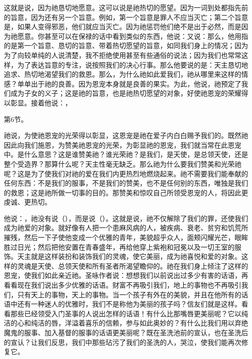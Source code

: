 这就是说，因为祂恳切地愿意。这可以说是祂热切的愿望。因为一词到处都指先前的旨意，因为还有另一个旨意。例如，第一个旨意是罪人不应当灭亡；第二个旨意是，如果人变得邪恶，他们就应当灭亡。因为祂惩罚他们绝不是出于必然，而是因为祂愿意。你甚至可以在保禄的话中看到类似的东西，他说：又说：那么，他用指的是第一个旨意、恳切的旨意、带着热切愿望的旨意，如同我们身上的情况；因为为了向较单纯的人说清楚，我不拒绝使用甚至有些通俗的说法；因为我们也常常这样，为了表达旨意的专注，说按照我们的决心行事。那么他要说的是：天主恳切地追求、热切地渴望我们的救恩。那么，为什么祂如此爱我们，祂从哪里来这样的情感？单单出于祂的良善。因为恩宠本身就是良善的果实。为此，他说，祂预定了我们成为子女的义子；这是祂的旨意，也是祂热切愿望的对象，好使祂恩宠的荣耀得以彰显。接着他说：，\par

第6节。\par

祂说，为使祂恩宠的光荣得以彰显，这恩宠是祂在爱子内白白赐予我们的。既然祂因此向我们施恩，为赞美祂恩宠的光荣，为彰显祂的恩宠，我们就当常在此恩宠中。是什么意思？这是谁赞美祂？谁光荣祂？是我们，是天使，是总领天使，还是整个受造界？那算什么呢？天主性毫无缺乏。那么祂为什么要我们赞美和光荣祂呢？这是为了使我们对祂的爱在我们内更热烈地燃烧起来。祂不需要我们能奉献的任何东西：不是我们的服事，不是我们的赞美，也不是任何别的东西，唯独是我们的救恩；这是祂所做一切事的目的。那赞美和惊叹自己所领受恩宠的人，将因此更虔诚、更热切。\par

他说：，祂没有说（），而是说（）。这就是说，祂不仅解除了我们的罪，还使我们成为祂爱的对象。就好像有人把一个患麻风病的人，被疾病、衰老、贫穷和饥荒所摧残，然后一下子使他变成一个优雅的青年，美貌超乎众人，面颊闪耀光芒，眼眸胜过日光；然后把他安置在青春盛年，再给他穿上紫袍和冠冕以及一切王室的服饰。天主就是这样装扮和装饰我们的灵魂，使它美丽，成为祂喜悦和爱的对象。这样的灵魂是天使、总领天使和所有圣者所渴望瞻仰的。祂在我们身上倾注了这样的恩宠，使我们如此亲近祂。圣咏作者说：想想我们以前说出过多少有害的话语，再看看现在我们说出多少优雅的话语。财富不再吸引我们，地上的事物也不再吸引我们，只有天上的事物，天上的事物。当一个孩子有外在的美貌，并且在他所有的话语中还有一种迷人的优雅时，我们不是称他为美丽的孩子吗？信友们就是这样。看看那些已经领受入门圣事的人说出怎样的话语！有什么比那嘴唇更美丽呢？它以纯洁的心和纯洁的唇，洋溢着喜乐的信赖，参与如此奥妙的？有什么比我们用以弃绝魔鬼的服事、加入基督的服事的话语更美丽呢？既在圣洗池前的宣认，也在圣洗后的宣认？让我们反思，我们中那些玷污了我们的圣洗的人，哭泣，使我们能再次修复它。\par

